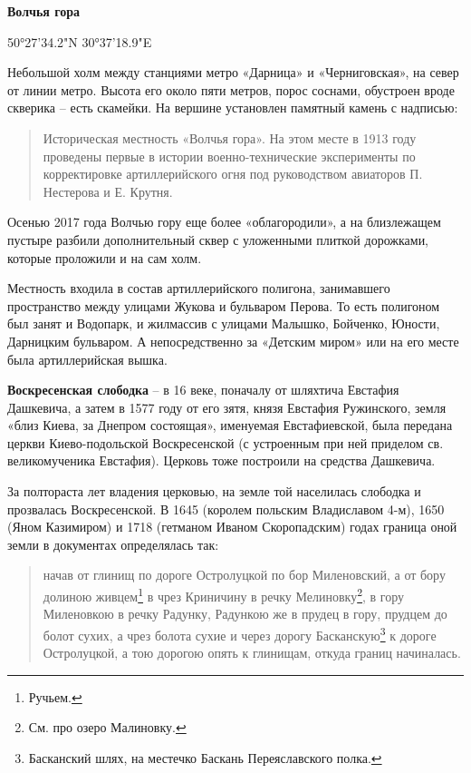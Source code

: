 \medskip

\textbf{Волчья гора} 

50°27'34.2"N 30°37'18.9"E

Небольшой холм между станциями метро «Дарница» и «Черниговская», на север от линии метро. Высота его около пяти метров, порос соснами, обустроен вроде скверика – есть скамейки. На вершине установлен памятный камень с надписью: 

\begin{quotation}
Историческая местность «Волчья гора». На этом месте в 1913 году проведены первые в истории военно-техни\-ческие эксперименты по корректировке артиллерийского огня под руководством авиаторов П. Нестерова и Е. Крутня.
\end{quotation}

Осенью 2017 года Волчью гору еще более «облагородили», а на близлежащем пустыре разбили дополнительный сквер с уложенными плиткой дорожками, которые проложили и на сам холм.

Местность входила в состав артиллерийского полигона, занимавшего пространство между улицами Жукова и бульваром Перова. То есть  полигоном был занят и Водопарк, и жилмассив с улицами Малышко, Бойченко, Юности, Дарницким бульваром. А непосредственно за «Детским миром» или на его месте была артиллерийская вышка.\\

\medskip


\textbf{Воскресенская слободка} – в 16 веке, поначалу от шляхтича Евстафия Дашкевича, а затем в 1577 году от его зятя, князя Евстафия Ружинского, земля «близ Киева, за Днепром состоящая», именуемая Евстафиевской, была передана церкви Киево-подольской Воскресенской (с устроенным при ней приделом св. великомученика Евстафия). Церковь тоже построили на средства Дашкевича.

За полтораста лет владения церковью, на земле той населилась слободка и прозвалась Воскресенской. В 1645 (королем польским Владиславом 4-м), 1650 (Яном Казимиром) и 1718 (гетманом Иваном Скоропадским) годах граница оной земли в документах определялась так:

\begin{quotation}
начав от глинищ по дороге Остролуцкой по бор Миленовский, а от бору долиною живцем\footnote{Ручьем.} в чрез Криничину в речку Мелиновку\footnote{См. про озеро Малиновку.}, в гору Миленовкою в речку Радунку, Радункою же в прудец в гору, прудцем до болот сухих, а чрез болота сухие и через дорогу Басканскую\footnote{Басканский шлях, на местечко Баскань Переяславского полка.} к дороге Остролуцкой, а тою дорогою опять к глинищам, откуда границ начиналась.
\end{quotation}

